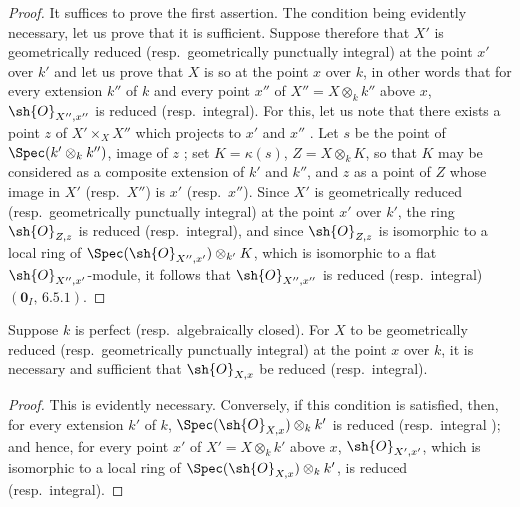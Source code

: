 \begin{proof}
It suffices to prove the first assertion.
The condition being evidently necessary, let us prove that it is sufficient.
Suppose therefore that $X'$ is geometrically reduced (resp.\ geometrically punctually integral) at the point $x'$ over $k'$ and let us prove that $X$ is so at the point $x$ over $k$, in other words that for every extension $k''$ of $k$ and every point $x''$ of $X''=X\otimes_k k''$ above $x$, $\sh{O}_{X'',x''}$ is reduced (resp.\ integral).
For this, let us note that there exists a point $z$ of $X'\times_X X''$ which projects to $x'$ and $x''$ .
Let $s$ be the point of $\Spec(k'\otimes_k k'')$, image of $z$ ; set $K=\kappa(s)$, $Z=X\otimes_k K$, so that $K$ may be considered as a composite extension of $k'$ and $k''$, and $z$ as a point of $Z$ whose image in $X'$ (resp.\ $X''$) is $x'$ (resp.\ $x''$).
Since $X'$ is geometrically reduced (resp.\ geometrically punctually integral) at the point $x'$ over $k'$, the ring $\sh{O}_{Z,z}$ is reduced (resp.\ integral), and since $\sh{O}_{Z,z}$ is isomorphic to a local ring of $\Spec(\sh{O}_{X'',x'})\otimes_{k'} K$, which is isomorphic to a flat $\sh{O}_{X'',x'}$-module, it follows that $\sh{O}_{X'',x''}$ is reduced (resp.\ integral) $(\mathbf{0}_I,\,6.5.1)$.
\end{proof}

\begin{corollary}[4.6.11]
\label{IV.4.6.11}
Suppose $k$ is perfect (resp.\ algebraically closed).
For $X$ to be geometrically reduced (resp.\ geometrically punctually integral) at the point $x$ over $k$, it is necessary and sufficient that $\sh{O}_{X,x}$ be reduced (resp.\ integral).
\end{corollary}

\begin{proof}
This is evidently necessary.
Conversely, if this condition is satisfied, then, for every extension $k'$ of $k$, $\Spec(\sh{O}_{X,x})\otimes_k k'$ is reduced  (resp.\ integral );
and hence, for every point $x'$ of $X'=X\otimes_k k'$ above $x$, $\sh{O}_{X',x'}$, which is isomorphic to a local ring of $\Spec(\sh{O}_{X,x})\otimes_k k'$, is reduced (resp.\ integral).
\end{proof}

